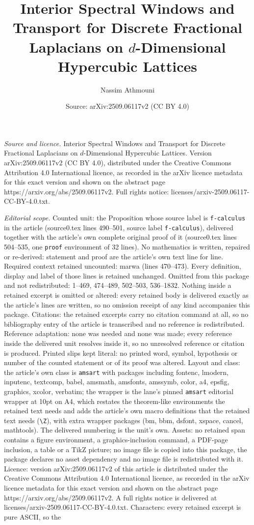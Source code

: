 \documentclass[10pt,a4paper]{amsart}
\title[Interior Spectral Windows and Transport for Discrete Fractio]{Interior Spectral Windows and Transport for Discrete Fractional Laplacians on $d$-Dimensional Hypercubic Lattices}
\author{Nassim Athmouni}
\date{Source: arXiv:2509.06117v2 (CC BY 4.0)}
\begin{document}
\maketitle

\noindent\emph{Source and licence.} Interior Spectral Windows and Transport for Discrete Fractional Laplacians on $d$-Dimensional Hypercubic Lattices. Version arXiv:2509.06117v2 (CC BY 4.0), distributed under the Creative Commons Attribution 4.0 International licence, as recorded in the arXiv licence metadata for this exact version and shown on the abstract page https://arxiv.org/abs/2509.06117v2. Full rights notice: licenses/arxiv-2509.06117-CC-BY-4.0.txt.\par\smallskip

\noindent\textit{Editorial scope.} Counted unit: the Proposition whose source label is \texttt{f-calculus} in the article (source0.tex lines 490--501, source label \texttt{f-calculus}), delivered together with the article's own complete original proof of it (source0.tex lines 504--535, one \texttt{proof} environment of 32 lines). No mathematics is written, repaired or re-derived: statement and proof are the article's own text line for line. Required context retained uncounted: marwa (lines 470--473). Every definition, display and label of those lines is retained unchanged. Omitted from this package and not redistributed: 1--469, 474--489, 502--503, 536--1832. Nothing inside a retained excerpt is omitted or altered: every retained body is delivered exactly as the article's lines are written, so no omission receipt of any kind accompanies this package. Citations: the retained excerpts carry no citation command at all, so no bibliography entry of the article is transcribed and no reference is redistributed. Reference adaptation: none was needed and none was made; every reference inside the delivered unit resolves inside it, so no unresolved reference or citation is produced. Printed slips kept literal: no printed word, symbol, hypothesis or number of the counted statement or of its proof was altered. Layout and class: the article's own class is \texttt{amsart} with packages including fontenc, lmodern, inputenc, textcomp, babel, amsmath, amsfonts, amssymb, color, a4, epsfig, graphics, xcolor, verbatim; the wrapper is the lane's pinned \texttt{amsart} editorial wrapper at 10pt on A4, which restates the theorem-like environments the retained text needs and adds the article's own macro definitions that the retained text needs (\texttt{\textbackslash Z}), with extra wrapper packages (bm, bbm, dsfont, xspace, cancel, mathtools). The delivered numbering is the unit's own. Assets: no retained span contains a figure environment, a graphics-inclusion command, a PDF-page inclusion, a table or a TikZ picture; no image file is copied into this package, the package declares no asset dependency and no image file is redistributed with it. Licence: version arXiv:2509.06117v2 of this article is distributed under the Creative Commons Attribution 4.0 International licence, as recorded in the arXiv licence metadata for this exact version and shown on the abstract page https://arxiv.org/abs/2509.06117v2. A full rights notice is delivered at licenses/arxiv-2509.06117-CC-BY-4.0.txt. Characters: every retained excerpt is pure ASCII, so the 
\end{document}
